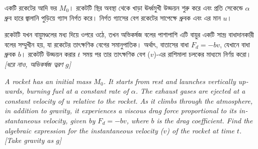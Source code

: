 \documentclass[12pt, a4paper]{article}
\begin{document}
\begin{tcolorbox}[questionbox={প্রশ্ন (Question) 1}]
\noindent
একটি রকেটের আদি ভর $M_0$। রকেটটি স্থির অবস্থা থেকে খাড়া ঊর্ধ্বমুখী উড্ডয়ন শুরু করে এবং প্রতি সেকেন্ডে $\alpha$ ধ্রুব হারে জ্বালানি পুড়িয়ে গ্যাস নির্গত করে। নির্গত গ্যাসের বেগ রকেটের সাপেক্ষে ধ্রুবক এবং এর মান $u$। 

\vspace{0.3em}
\noindent
রকেটটি যখন বায়ুমণ্ডলের মধ্য দিয়ে ওপরে ওঠে, তখন অভিকর্ষজ বলের পাশাপাশি এটি বায়ুর একটি সান্দ্র বাধাদানকারী বলের সম্মুখীন হয়, যা রকেটের তাৎক্ষণিক বেগের সমানুপাতিক। অর্থাৎ, বাতাসের বাধা $F_d = -b v$, যেখানে বাধা ধ্রুবক $b$। রকেটটি উড্ডয়ন করার $t$ সময় পর তার তাৎক্ষণিক বেগ ($v$)-এর রাশিমালা চলকের মাধ্যমে নির্ণয় করো। \\
\textit{[ধরে নাও, অভিকর্ষজ ত্বরণ $g$]}

\vspace{0.8em}
\begin{english}
\noindent\textit{\color{darkgray}
A rocket has an initial mass $M_0$. It starts from rest and launches vertically upwards, burning fuel at a constant rate of $\alpha$. The exhaust gases are ejected at a constant velocity of $u$ relative to the rocket. As it climbs through the atmosphere, in addition to gravity, it experiences a viscous drag force proportional to its instantaneous velocity, given by $F_d = -b v$, where $b$ is the drag coefficient. Find the algebraic expression for the instantaneous velocity ($v$) of the rocket at time $t$. [Take gravity as $g$]
}
\end{english}
\end{tcolorbox}
\end{document}
